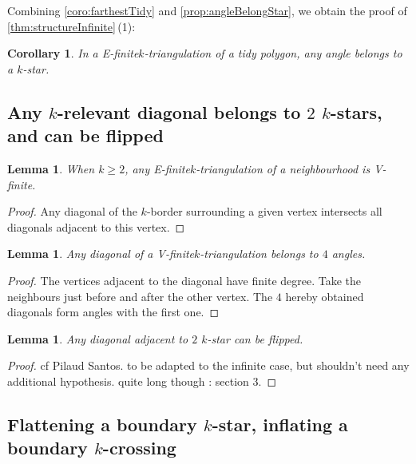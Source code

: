 \documentclass{amsart}
\newtheorem{lemma}[theorem]{Lemma}
\newtheorem{corollary}[theorem]{Corollary}
\theoremstyle{remark}
\newcommand*{\nbd}[0]{neighbourhood\xspace}
\newcommand*{\ef}[0]{E-finite\xspace}
\newcommand*{\vf}[0]{V-finite\xspace}
\newcommand*{\ktg}[0]{$k$-triangulation\xspace}
\begin{document}
Combining \cref{coro:farthestTidy} and \cref{prop:angleBelongStar}, we obtain the proof of \cref{thm:structureInfinite}\,(1):

\begin{corollary}
In a \ef \ktg of a tidy polygon, any angle belongs to a $k$-star.
\end{corollary}


\subsection{Any $k$-relevant diagonal belongs to $2$ $k$-stars, and can be flipped}

\begin{lemma}
When $k\geq 2$, any \ef \ktg of a \nbd is \vf.
\end{lemma}
\begin{proof}
Any diagonal of the $k$-border surrounding a given vertex intersects all diagonals adjacent to this vertex.
\end{proof}

\begin{lemma}
Any diagonal of a \vf \ktg belongs to $4$ angles.
\end{lemma}
\begin{proof}
The vertices adjacent to the diagonal have finite degree. Take the neighbours just before and after the other vertex. The $4$ hereby obtained diagonals form angles with the first one.
\end{proof}

\begin{lemma}
Any diagonal adjacent to $2$ $k$-star can be flipped.
\end{lemma}
\begin{proof}
cf Pilaud Santos. to be adapted to the infinite case, but shouldn't need any additional hypothesis. quite long though : section 3.
\end{proof}

\subsection{Flattening a boundary $k$-star, inflating a boundary $k$-crossing}
\end{document}
